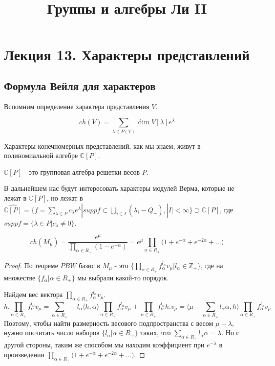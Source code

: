 \documentclass[a4article]{article}
\title{Группы и алгебры Ли II}
\author{}
\date{}
\begin{document}
\maketitle

\section*{Лекция 13. Характеры представлений}
\subsection*{Формула Вейля для характеров}
Вспомним определение характера представления $V$.
\begin{definition}
    \begin{equation}
        ch(V)=\sum_{\lambda \in P(V)}\dim V[\lambda]e^{\lambda} 
    \end{equation}
\end{definition}
Характеры конечномерных представлений, как мы знаем, живут в полиномиальной алгебре $\mathbb{C}[P]$.
\begin{remark}
    $\mathbb{C}[P]$ - это групповая алгебра решетки весов $P$.
\end{remark}
В дальнейшем нас будут интересовать характеры модулей Верма, которые не лежат в $\mathbb{C}[P]$, но лежат в $\widehat{\mathbb{C}[P]}=\{f=\sum_{\lambda \in P}c_{\lambda}e^{\lambda}|supp f \subset \bigcup_{i \in I} (\lambda_i-Q_+), |I| < \infty\} \supset \mathbb{C}[P]$, где $supp f= \{\lambda \in P|c_{\lambda} \ne 0\}$. 
\begin{lemma}
    \begin{equation}
        ch(M_{\mu})=\frac{e^{\mu}}{\prod_{\alpha \in R_+}(1-e^{-\alpha})}=e^{\mu}{\prod_{\alpha \in R_+}(1+e^{-\alpha}+e^{-2\alpha}+\ldots})
    \end{equation}
\end{lemma}
\begin{proof}
    По теореме $PBW$ 
    базис в $M_{\mu}$ - это $\{\prod_{\alpha \in R_+}f^{l_{\alpha}}_{\alpha}v_{\mu}|l_{\alpha} \in \mathbb{Z}_+\}$, где на множестве $\{f_{\alpha}|\alpha \in R_+\}$ мы выбрали какой-то порядок.
    
    Найдем вес вектора $\prod_{\alpha \in R_+}f^{l_{\alpha}}_{\alpha}v_{\mu}$.
    $$h.\prod_{\alpha \in R_+}f^{l_{\alpha}}_{\alpha}v_{\mu}=\sum_{\alpha \in R_+}-l_{\alpha}\langle h, \alpha \rangle \prod_{\alpha \in R_+}f^{l_{\alpha}}_{\alpha}v_{\mu}+\prod_{\alpha \in R_+}f^{l_{\alpha}}_{\alpha}h.v_{\mu}=\langle\mu-\sum_{\alpha \in R_+}l_{\alpha}\alpha,h \rangle \prod_{\alpha \in R_+}f^{l_{\alpha}}_{\alpha}v_{\mu}$$
    Поэтому, чтобы найти размерность весового подпространства с весом $\mu-\lambda$, нужно посчитать число наборов $\{l_{\alpha}|\alpha \in R_+\}$ таких, что $\sum_{\alpha \in R_+}l_{\alpha}\alpha=\lambda$. Но с другой стороны, таким же способом мы находим коэффициент при $e^{-\lambda}$ в произведении ${\prod_{\alpha \in R_+}(1+e^{-\alpha}+e^{-2\alpha}+\ldots})$.
\end{proof}
\end{document}
